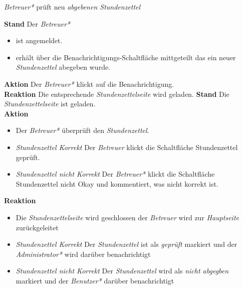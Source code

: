 \begin{requirements}
	 \emph{Betreuer*} prüft neu \emph{abgebenen Stundenzettel}
	\begin{requirements}
	        \textbf{Stand} Der \emph{Betreuer*}
	            \begin{itemize}
	                \item ist angemeldet.
	                \item erhält über die Benachrichtigungs-Schaltfläche mittgeteilt das ein neuer \emph{Stundenzettel} abegeben wurde.
	            \end{itemize}
            \textbf{Aktion} Der \emph{Betreuer*} klickt auf die Benachrichtigung. \\
            \textbf{Reaktion} Die entsprechende \emph{Stundenzettelseite} wird  geladen.
	        \textbf{Stand} Die \emph{Stundenzettelseite} ist geladen. \\
            \textbf{Aktion}
                \begin{itemize}
                    \item Der \emph{Betreuer*} überprüft den \emph{Stundenzettel}.
                    \item \textit{Stundenzettel Korrekt} Der \emph{Betreuer} klickt die Schaltfläche Stundenzettel geprüft.
                    \item \textit{Stundenzettel nicht Korrekt}  Der \emph{Betreuer*} klickt die Schaltfläche Stundenzettel nicht Okay und kommentiert, was nicht korrekt ist.
                \end{itemize}
            \textbf{Reaktion}
                \begin{itemize}
                    \item Die \emph{Stundenzettelseite} wird geschlossen der \emph{Betreuer} wird zur \emph{Hauptseite} zurückgeleitet
                    \item \textit{Stundenzettel Korrekt} Der \emph{Stundenzettel} ist als \emph{geprüft} markiert und der \emph{Administrator*} wird darüber benachrichtigt
                    \item \textit{Stundenzettel nicht Korrekt} Der \emph{Stundenzettel} wird als \emph{nicht abgegben} markiert und der \emph{Benutzer*} darüber benachrichtigt
                \end{itemize}
	\end{requirements}


\end{requirements}
